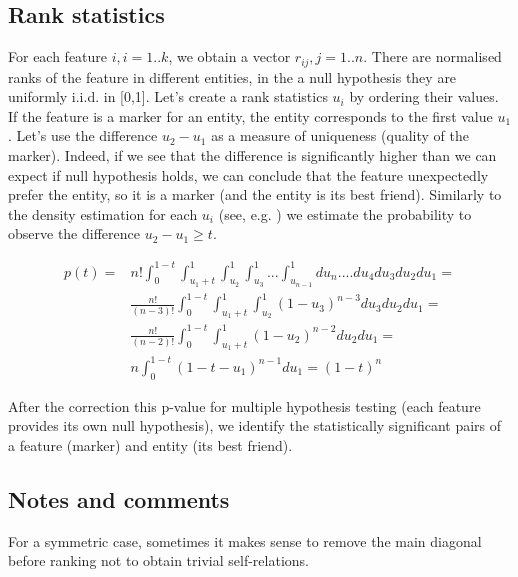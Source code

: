 \documentclass{llncs}
\begin{document}
\subsection{Rank statistics}
For each feature $i,i=1..k$, we obtain a vector $r_{ij}, j=1..n$. There are normalised ranks of the feature in different entities, in the a null hypothesis they are uniformly i.i.d. in [0,1]. Let's create a rank statistics $u_i$ by ordering their values. If the feature is a marker for an entity, the entity corresponds to the first value $u_1$. Let's use the difference $u_2-u_1$ as a measure of uniqueness (quality of the marker). Indeed, if we see that the difference is significantly higher than we can expect if null hypothesis holds, we can conclude that the feature unexpectedly prefer the entity, so it is a marker (and the entity is its best friend). Similarly to the density estimation for each $u_i$ (see, e.g. \cite{Gut:2009}) we estimate the probability to observe the difference $u_2 - u_1 \ge t$. 

\begin{eqnarray*}
p(t) = & n!\displaystyle \int_0^{1-t}\int_{{u_1}+t}^1\int_{u_2}^1\int_{u_3}^1...\int_{u_{n-1}}^1 du_n....du_4 du_3 du_2 du_1 = \\ 
&\displaystyle \frac{n!}{(n-3)!}\int_0^{1-t}\int_{{u_1}+t}^1\int_{u_2}^1 \left( 1-u_3 \right)^{n-3}du_3 du_2 du_1 = \\
&\displaystyle \frac{n!}{(n-2)!}\int_0^{1-t}\int_{{u_1}+t}^1\left( 1-u_2 \right)^{n-2} du_2 du_1 = \\
&\displaystyle n \int_0^{1-t}\left( 1-t-u_1 \right)^{n-1} du_1 = (1-t)^n
\end{eqnarray*}

After the correction this p-value for multiple hypothesis testing (each feature provides its own null hypothesis), we identify the statistically significant pairs of a feature (marker) and entity (its best friend). 

\subsection*{Notes and comments}

For a symmetric case, sometimes it makes sense to remove the main diagonal before ranking not to obtain trivial self-relations.
\end{document}
